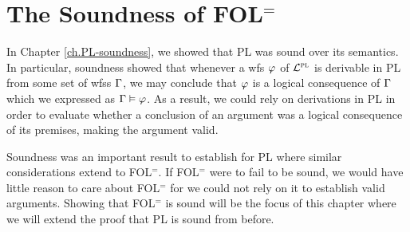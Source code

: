 ﻿%
\chapter{The Soundness of FOL$^=$}
  \label{ch.FOL-soundness}


In Chapter \ref{ch.PL-soundness}, we showed that PL was sound over its semantics.
In particular, soundness showed that whenever a wfs $\varphi$ of $\mathcal{L}^{\textsc{pl}}$ is derivable in PL from some set of wfss $\Gamma$, we may conclude that $\varphi$ is a logical consequence of $\Gamma$ which we expressed as $\Gamma \vDash \varphi$.
As a result, we could rely on derivations in PL in order to evaluate whether a conclusion of an argument was a logical consequence of its premises, making the argument valid.

Soundness was an important result to establish for PL where similar considerations extend to FOL$^=$.
If FOL$^=$ were to fail to be sound, we would have little reason to care about FOL$^=$ for we could not rely on it to establish valid arguments.
Showing that FOL$^=$ is sound will be the focus of this chapter where we will extend the proof that PL is sound from before.

